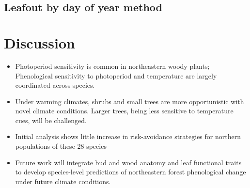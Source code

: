 \documentclass[11pt]{article}
\begin{document}
\subsection{Leafout by day of year method}


 

\section{Discussion}

\begin{itemize}

\item{Photoperiod sensitivity is common in northeastern woody plants; Phenological sensitivity to photoperiod and temperature are largely coordinated across species.}
\item{Under warming climates, shrubs and small trees are more opportunistic with novel climate conditions. Larger trees, being less sensitive to temperature cues, will be challenged. }
\item{Initial analysis shows little increase in risk-avoidance strategies for northern populations of these 28 species}
\item{Future work will integrate bud and wood anatomy and leaf functional traits to develop species-level predictions of northeastern forest phenological change under future climate conditions.}
\end{itemize}
\end{document}
